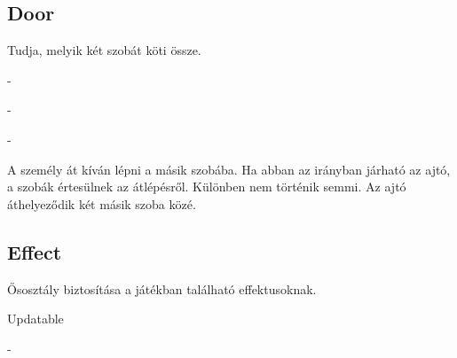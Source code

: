 \subsection{Door}
\begin{class-template-responsibility}
    Tudja, melyik két szobát köti össze.
\end{class-template-responsibility}
\begin{class-template-interface}
    -
\end{class-template-interface}
\begin{class-template-baseclass}
    -
\end{class-template-baseclass}
\begin{class-template-attribute}
    -
\end{class-template-attribute}
\begin{class-template-method}
     {A személy át kíván lépni a másik szobába. Ha abban az irányban járható az ajtó, a szobák értesülnek az átlépésről. Különben nem történik semmi.}
     {Az ajtó áthelyeződik két másik szoba közé.}
\end{class-template-method}

\subsection{Effect}
\begin{class-template-responsibility}
    Ősosztály biztosítása a játékban található effektusoknak.
\end{class-template-responsibility}
\begin{class-template-interface}
    Updatable
\end{class-template-interface}
\begin{class-template-baseclass}
    -
\end{class-template-baseclass}
\begin{class-template-attribute}
\end{class-template-attribute}
\begin{class-template-method}
\end{class-template-method}

